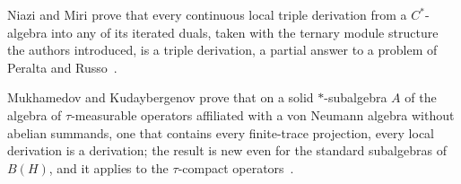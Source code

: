 Niazi and Miri prove that every continuous local triple derivation from a $C^*$-algebra into any of its iterated duals, taken with the ternary module structure the authors introduced, is a triple derivation, a partial answer to a problem of Peralta and Russo~\cite{WlLocalTripleDerivationsFromCSta2018}.

Mukhamedov and Kudaybergenov prove that on a solid $*$-subalgebra $A$ of the algebra of $\tau$-measurable operators affiliated with a von Neumann algebra without abelian summands, one that contains every finite-trace projection, every local derivation is a derivation; the result is new even for the standard subalgebras of $B(H)$, and it applies to the $\tau$-compact operators~\cite{WlLocalDerivationsOnSubalgebrasO2015}.
